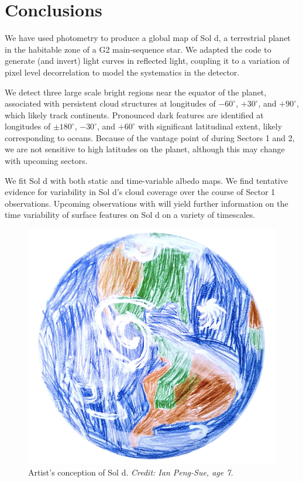 \documentclass[modern]{aastex62}
\begin{document}
\section{Conclusions}
\label{sec:conclusions}

We have used \TESS photometry to
produce a global map of Sol d, a terrestrial planet in the habitable
zone of a G2 main-sequence star. We adapted the \starry code to 
generate (and invert) light curves in reflected light, coupling it
to a variation of pixel level decorrelation to model the systematics
in the \TESS detector. 

We detect three large scale bright regions near
the equator of the planet, associated with persistent cloud structures
at longitudes of $-60^\circ$, $+30^\circ$, and $+90^\circ$, which
likely track continents. Pronounced dark features are identified
at longitudes of $\pm 180^\circ$, $-30^\circ$, and $+60^\circ$ with
significant latitudinal extent, likely corresponding to oceans. Because of the
vantage point of \TESS during Sectors 1 and 2, we are not sensitive to
high latitudes on the planet, although this may change with upcoming
sectors. 

We fit Sol d with both static and time-variable albedo maps. 
We find tentative evidence for variability in Sol d's cloud coverage over 
the course of Sector 1 observations. 
Upcoming observations with \TESS will yield further information on 
the time variability of surface features on Sol d on a variety of timescales.

\begin{figure}[t!]
    \begin{centering}
    \includegraphics[width=0.5\linewidth]{figures/artist.png}
    \caption{\label{fig:artist}
             Artist's conception of Sol d.
             \emph{Credit: Ian Peng-Sue, age 7.}
             }
    \end{centering}
\end{figure}
\end{document}
